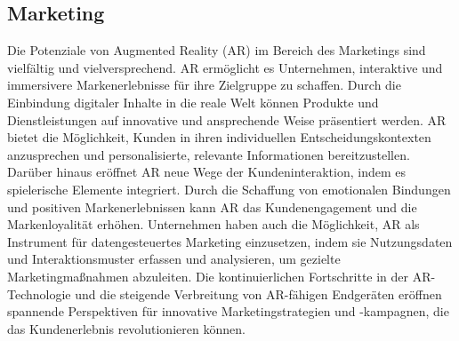 \subsection{Marketing}
Die Potenziale von Augmented Reality (AR) im Bereich des Marketings sind
vielfältig und vielversprechend. AR ermöglicht es Unternehmen, interaktive und
immersivere Markenerlebnisse für ihre Zielgruppe zu schaffen. Durch die
Einbindung digitaler Inhalte in die reale Welt können Produkte und
Dienstleistungen auf innovative und ansprechende Weise präsentiert werden. AR
bietet die Möglichkeit, Kunden in ihren individuellen Entscheidungskontexten
anzusprechen und personalisierte, relevante Informationen bereitzustellen.
Darüber hinaus eröffnet AR neue Wege der Kundeninteraktion, indem es
spielerische Elemente integriert. Durch die Schaffung von emotionalen Bindungen
und positiven Markenerlebnissen kann AR das Kundenengagement und die
Markenloyalität erhöhen. Unternehmen haben auch die Möglichkeit, AR als
Instrument für datengesteuertes Marketing einzusetzen, indem sie Nutzungsdaten
und Interaktionsmuster erfassen und analysieren, um gezielte Marketingmaßnahmen
abzuleiten. Die kontinuierlichen Fortschritte in der AR-Technologie und die
steigende Verbreitung von AR-fähigen Endgeräten eröffnen spannende Perspektiven
für innovative Marketingstrategien und -kampagnen, die das Kundenerlebnis
revolutionieren können.\cite{chylinski2020augmented,rauschnabel2019augmented}


